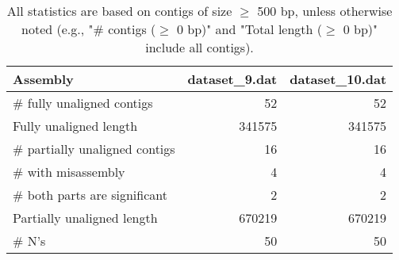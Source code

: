 \documentclass[12pt,a4paper]{article}
\begin{document}
\begin{table}[ht]
\begin{center}
\caption{All statistics are based on contigs of size $\geq$ 500 bp, unless otherwise noted (e.g., "\# contigs ($\geq$ 0 bp)" and "Total length ($\geq$ 0 bp)" include all contigs).}
\begin{tabular}{|l*{2}{|r}|}
\hline
Assembly & dataset\_9.dat & dataset\_10.dat \\ \hline
\# fully unaligned contigs & 52 & 52 \\ \hline
Fully unaligned length & 341575 & 341575 \\ \hline
\# partially unaligned contigs & 16 & 16 \\ \hline
\hspace{5mm}\# with misassembly & 4 & 4 \\ \hline
\hspace{5mm}\# both parts are significant & 2 & 2 \\ \hline
Partially unaligned length & 670219 & 670219 \\ \hline
\# N's & 50 & 50 \\ \hline
\end{tabular}
\end{center}
\end{table}
\end{document}
